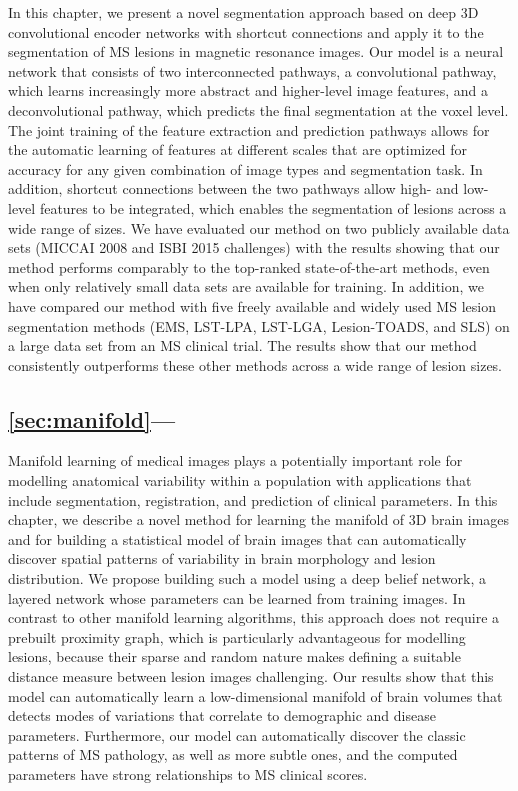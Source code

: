 In this chapter, we present a novel segmentation approach based on deep 3D
convolutional encoder networks with shortcut connections and apply it to the
segmentation of MS lesions in magnetic resonance images. Our model is a neural
network that consists of two interconnected pathways, a convolutional pathway,
which learns increasingly more abstract and higher-level image features, and a
deconvolutional pathway, which predicts the final segmentation at the voxel
level. The joint training of the feature extraction and prediction pathways
allows for the automatic learning of features at different scales that are
optimized for accuracy for any given combination of image types and segmentation
task. In addition, shortcut connections between the two pathways allow high- and
low-level features to be integrated, which enables the segmentation of lesions
across a wide range of sizes. We have evaluated our method on two publicly
available data sets (MICCAI 2008 and ISBI 2015 challenges) with the results
showing that our method performs comparably to the top-ranked state-of-the-art
methods, even when only relatively small data sets are available for training.
In addition, we have compared our method with five freely available and widely
used MS lesion segmentation methods (EMS, LST-LPA, LST-LGA, Lesion-TOADS, and
SLS) on a large data set from an MS clinical trial.
The results show that our method consistently outperforms these other methods
across a wide range of lesion sizes.

\subsection*{\ref{sec:manifold}---}

Manifold learning of medical images plays a potentially important role for
modelling anatomical variability within a population with applications that
include segmentation, registration, and prediction of clinical parameters.
In this chapter, we describe a novel method for learning the manifold of 3D
brain images and for building a statistical model of brain images that can
automatically discover spatial patterns of variability in brain morphology and
lesion distribution. We propose building such a model using a deep belief
network, a layered network whose parameters can be learned from training
images. In contrast to other manifold learning algorithms, this approach does
not require a prebuilt proximity graph, which is particularly advantageous for
modelling lesions, because their sparse and random nature makes defining a
suitable distance measure between lesion images challenging. Our results show
that this model can automatically learn a low-dimensional manifold of brain
volumes that detects modes of variations that correlate to demographic and
disease parameters. Furthermore, our model can automatically discover the
classic patterns of MS pathology, as well as more subtle ones, and the
computed parameters have strong relationships to MS clinical scores.

